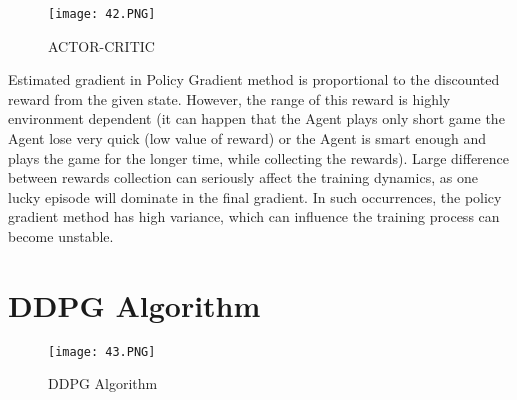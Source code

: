 \begin{wrapfigure}{h}{0.5\textwidth}
    \centering
    \vspace{-20pt}
    \texttt{[image: 42.PNG]}
    \caption{ACTOR-CRITIC}
    \label{fig:ACTOR-CRITIC algo}
\end{wrapfigure}

Estimated gradient in Policy Gradient method is proportional to the discounted reward from the given state. However, the range of this reward is highly environment dependent (it can happen that the Agent plays only short game the Agent lose very quick (low value of reward) or the Agent is smart enough and plays the game for the longer time, while collecting the rewards). Large difference between rewards collection can seriously affect the training dynamics, as one lucky episode will dominate in the final gradient. In such occurrences, the policy gradient method has high variance, which can influence the training process can become unstable.

\section{DDPG Algorithm}
\begin{wrapfigure}{h}{0.5\textwidth}
    \centering
    \texttt{[image: 43.PNG]}
    \caption{DDPG Algorithm}
    \label{fig:DDPG algo}
\end{wrapfigure}

